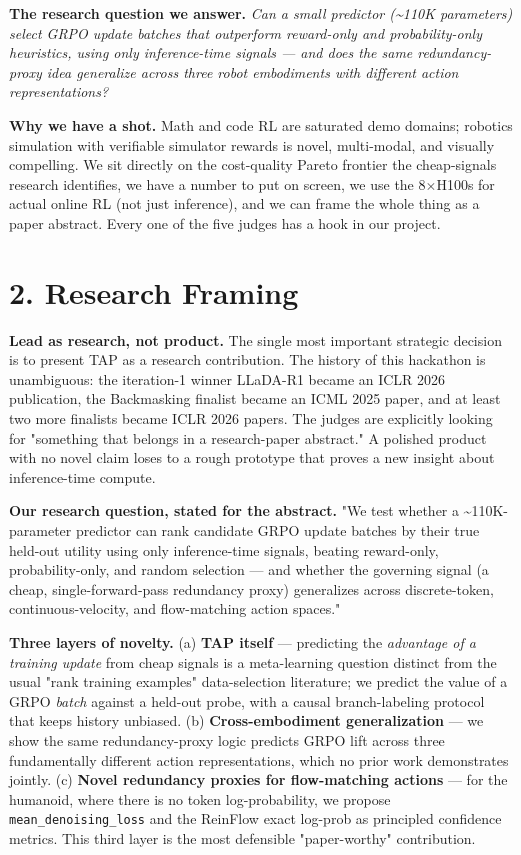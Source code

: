 \documentclass[11pt,letterpaper]{article}
\begin{document}
\textbf{The research question we answer.} \emph{Can a small predictor (\textasciitilde{}110K parameters) select GRPO update batches that outperform reward-only and probability-only heuristics, using only inference-time signals --- and does the same redundancy-proxy idea generalize across three robot embodiments with different action representations?}

\textbf{Why we have a shot.} Math and code RL are saturated demo domains; robotics simulation with verifiable simulator rewards is novel, multi-modal, and visually compelling. We sit directly on the cost-quality Pareto frontier the cheap-signals research identifies, we have a number to put on screen, we use the 8$\times$H100s for actual online RL (not just inference), and we can frame the whole thing as a paper abstract. Every one of the five judges has a hook in our project.

\medskip

\section*{2. Research Framing}

\textbf{Lead as research, not product.} The single most important strategic decision is to present TAP as a research contribution. The history of this hackathon is unambiguous: the iteration-1 winner LLaDA-R1 became an ICLR 2026 publication, the Backmasking finalist became an ICML 2025 paper, and at least two more finalists became ICLR 2026 papers. The judges are explicitly looking for "something that belongs in a research-paper abstract." A polished product with no novel claim loses to a rough prototype that proves a new insight about inference-time compute.

\textbf{Our research question, stated for the abstract.} "We test whether a \textasciitilde{}110K-parameter predictor can rank candidate GRPO update batches by their true held-out utility using only inference-time signals, beating reward-only, probability-only, and random selection --- and whether the governing signal (a cheap, single-forward-pass redundancy proxy) generalizes across discrete-token, continuous-velocity, and flow-matching action spaces."

\textbf{Three layers of novelty.} (a) \textbf{TAP itself} --- predicting the \emph{advantage of a training update} from cheap signals is a meta-learning question distinct from the usual "rank training examples" data-selection literature; we predict the value of a GRPO \emph{batch} against a held-out probe, with a causal branch-labeling protocol that keeps history unbiased. (b) \textbf{Cross-embodiment generalization} --- we show the same redundancy-proxy logic predicts GRPO lift across three fundamentally different action representations, which no prior work demonstrates jointly. (c) \textbf{Novel redundancy proxies for flow-matching actions} --- for the humanoid, where there is no token log-probability, we propose \texttt{mean\_denoising\_loss} and the ReinFlow exact log-prob as principled confidence metrics. This third layer is the most defensible "paper-worthy" contribution.
\end{document}
